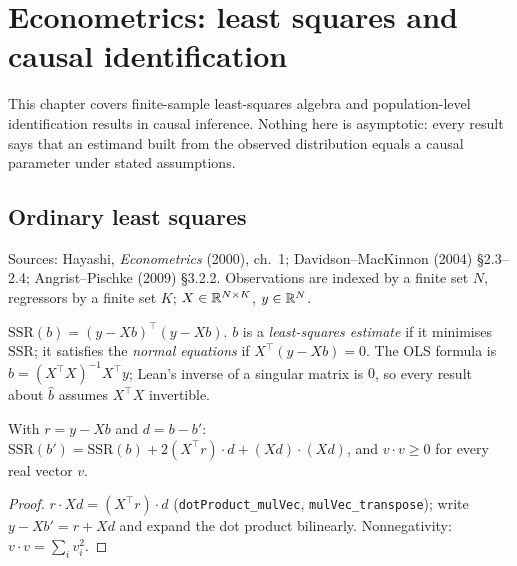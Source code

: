 \chapter{Econometrics: least squares and causal identification}
\label{chap:econometrics}

This chapter covers finite-sample least-squares algebra and population-level identification results in
causal inference. Nothing here is asymptotic: every result says that an estimand built from the observed
distribution equals a causal parameter under stated assumptions.

\section{Ordinary least squares}
\label{sec:ols}

Sources: Hayashi, \emph{Econometrics} (2000), ch.~1; Davidson--MacKinnon (2004) \S2.3--2.4;
Angrist--Pischke (2009) \S3.2.2. Observations are indexed by a finite set $N$, regressors by a finite set
$K$; $X \in \mathbb{R}^{N \times K}$, $y \in \mathbb{R}^N$.

\begin{definition}
\label{def:ols}
\leanok
$\mathrm{SSR}(b) = (y - Xb)^\top (y - Xb)$. $b$ is a \emph{least-squares estimate} if it minimises
$\mathrm{SSR}$; it satisfies the \emph{normal equations} if $X^\top (y - Xb) = 0$. The OLS formula is
$\hat b = (X^\top X)^{-1} X^\top y$; Lean's inverse of a singular matrix is $0$, so every result about
$\hat b$ assumes $X^\top X$ invertible.
\end{definition}

\begin{lemma}
\label{lem:ssr-eq}
\leanok
{}
With $r = y - Xb$ and $d = b - b'$: $\mathrm{SSR}(b') = \mathrm{SSR}(b) + 2 (X^\top r)\cdot d + (Xd)\cdot(Xd)$,
and $v \cdot v \ge 0$ for every real vector $v$.
\end{lemma}
\begin{proof}
\leanok
$r \cdot Xd = (X^\top r)\cdot d$ (\texttt{dotProduct\_mulVec}, \texttt{mulVec\_transpose}); write
$y - Xb' = r + Xd$ and expand the dot product bilinearly. Nonnegativity: $v\cdot v = \sum_i v_i^2$.
\end{proof}

